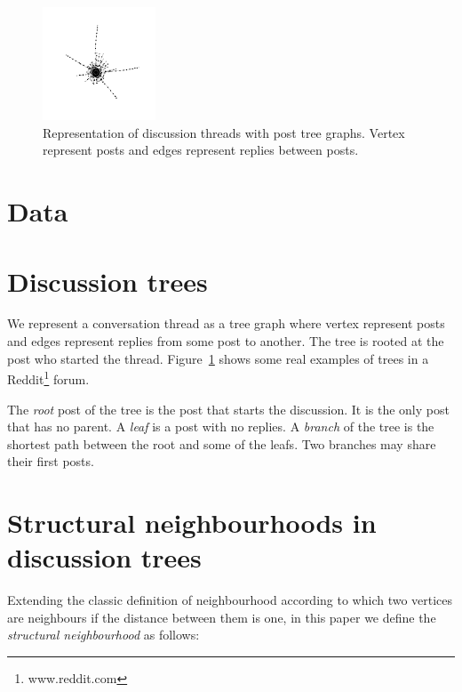 \documentclass[conference]{IEEEtran}
\begin{document}
\begin{figure}
	\centering
	\includegraphics[width=0.3\textwidth]{tree2}
	\caption{Representation of discussion threads with post tree graphs. Vertex represent posts and edges represent replies between posts.}
	\label{fig:trees}
\end{figure}

\section{Data}

\section{Discussion trees}
We represent a conversation thread as a tree graph where vertex represent posts and edges represent replies from some post to another. The tree is rooted at the post who started the thread. Figure~\ref{fig:trees} shows some real examples of trees in a Reddit\footnote{www.reddit.com} forum. 

The \textit{root} post of the tree is the post that starts the discussion. It is the only post that has no parent. A \textit{leaf} is a post with no replies.
A \textit{branch} of the tree is the shortest path between the root and some of the leafs. Two branches may share their first posts.

\section{Structural neighbourhoods in discussion trees}
Extending the classic definition of neighbourhood according to which two vertices are neighbours if the distance between them is one, in this paper we define the \textit{structural neighbourhood} as follows:
\end{document}
